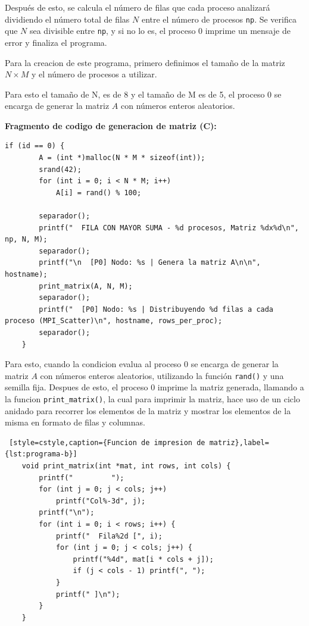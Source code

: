 \documentclass[letterpaper,11pt]{article}
\begin{document}
    Después de esto, se calcula el número de filas que cada proceso analizará dividiendo el número total de filas $N$ entre el número de procesos \texttt{np}. Se verifica que $N$ sea divisible entre \texttt{np}, y si no lo es, el proceso 0 imprime un mensaje de error y finaliza el programa.

    Para la creacion de este programa, primero definimos el tamaño de la matriz $N \times M$ y el número de procesos a utilizar. 

    Para esto el tamaño de N, es de 8 y el tamaño de M es de 5, el proceso 0 se encarga de generar la matriz $A$ con números enteros aleatorios.
    
    \textbf{Fragmento de codigo de generacion de matriz (C):}

    \begin{lstlisting}[style=cstyle,caption={Generacion de matriz por el proceso 0 e impresion},label={lst:programa-b}]
    if (id == 0) {
        A = (int *)malloc(N * M * sizeof(int));
        srand(42);
        for (int i = 0; i < N * M; i++)
            A[i] = rand() % 100;

        separador();
        printf("  FILA CON MAYOR SUMA - %d procesos, Matriz %dx%d\n", np, N, M);
        separador();
        printf("\n  [P0] Nodo: %s | Genera la matriz A\n\n", hostname);
        print_matrix(A, N, M);
        separador();
        printf("  [P0] Nodo: %s | Distribuyendo %d filas a cada proceso (MPI_Scatter)\n", hostname, rows_per_proc);
        separador();
    }
    \end{lstlisting}

    Para esto, cuando la condicion evalua al proceso 0 se encarga de generar la matriz $A$ con números enteros aleatorios, utilizando la función \texttt{rand()} 
    y una semilla fija. 
    Despues de esto, el proceso 0 imprime la matriz generada, llamando a la funcion \texttt{print\_matrix()}, la cual para imprimir la matriz, hace uso 
    de un ciclo anidado para recorrer los elementos de la matriz y mostrar los elementos de la misma en formato de filas y columnas.
    
    \begin{lstlisting} [style=cstyle,caption={Funcion de impresion de matriz},label={lst:programa-b}]
    void print_matrix(int *mat, int rows, int cols) {
        printf("         ");
        for (int j = 0; j < cols; j++)
            printf("Col%-3d", j);
        printf("\n");
        for (int i = 0; i < rows; i++) {
            printf("  Fila%2d [", i);
            for (int j = 0; j < cols; j++) {
                printf("%4d", mat[i * cols + j]);
                if (j < cols - 1) printf(", ");
            }
            printf(" ]\n");
        }
    }
    \end{lstlisting}
\end{document}
